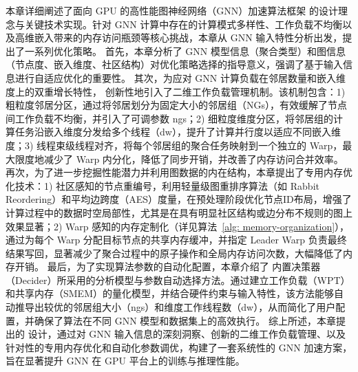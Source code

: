 本章详细阐述了面向 GPU 的高性能图神经网络（GNN）加速算法框架 \Mname{} 的设计理念与关键技术实现。针对 GNN 计算中存在的计算模式多样性、工作负载不均衡以及高维嵌入带来的内存访问瓶颈等核心挑战，本章从 GNN 输入特性分析出发，提出了一系列优化策略。
首先，本章分析了 GNN 模型信息（聚合类型）和图信息（节点度、嵌入维度、社区结构）对优化策略选择的指导意义，强调了基于输入信息进行自适应优化的重要性。
其次，为应对 GNN 计算负载在邻居数量和嵌入维度上的双重增长特性，\Mname{} 创新性地引入了二维工作负载管理机制。该机制包含：1) 粗粒度邻居分区，通过将邻居划分为固定大小的邻居组（NGs），有效缓解了节点间工作负载不均衡，并引入了可调参数 ngs；2) 细粒度维度分区，将邻居组的计算任务沿嵌入维度分发给多个线程（dw），提升了计算并行度以适应不同嵌入维度；3) 线程束级线程对齐，将每个邻居组的聚合任务映射到一个独立的 Warp，最大限度地减少了 Warp 内分化，降低了同步开销，并改善了内存访问合并效率。
再次，为了进一步挖掘性能潜力并利用图数据的内在结构，本章提出了专用内存优化技术：1) 社区感知的节点重编号，利用轻量级图重排序算法（如 Rabbit Reordering）和平均边跨度（AES）度量，在预处理阶段优化节点ID布局，增强了计算过程中的数据时空局部性，尤其是在具有明显社区结构或边分布不规则的图上效果显著；2) Warp 感知的内存定制化（详见算法~\ref{alg: memory-organization}），通过为每个 Warp 分配目标节点的共享内存缓冲，并指定 Leader Warp 负责最终结果写回，显著减少了聚合过程中的原子操作和全局内存访问次数，大幅降低了内存开销。
最后，为了实现算法参数的自动化配置，本章介绍了 \Mname{} 内置决策器（Decider）所采用的分析模型与参数自动选择方法。通过建立工作负载（WPT）和共享内存（SMEM）的量化模型，并结合硬件约束与输入特性，该方法能够自动推导出较优的邻居组大小（ngs）和维度工作线程数（dw），从而简化了用户配置，并确保了算法在不同 GNN 模型和数据集上的高效执行。
综上所述，本章提出的 \Mname{} 设计，通过对 GNN 输入信息的深刻洞察、创新的二维工作负载管理、以及针对性的专用内存优化和自动化参数调优，构建了一套系统性的 GNN 加速方案，旨在显著提升 GNN 在 GPU 平台上的训练与推理性能。
